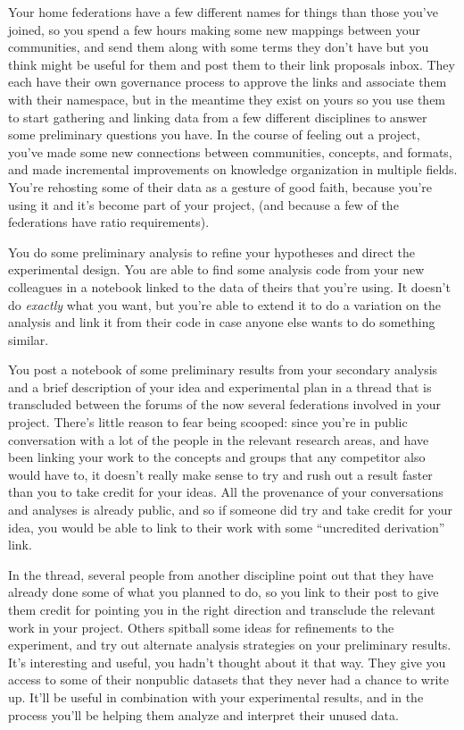 \documentclass[10pt]{article}
\begin{document}
\begin{multicols}{2}
Your home federations have a few different names for things than those
you've joined, so you spend a few hours making some new mappings between
your communities, and send them along with some terms they don't have
but you think might be useful for them and post them to their link
proposals inbox. They each have their own governance process to approve
the links and associate them with their namespace, but in the meantime
they exist on yours so you use them to start gathering and linking data
from a few different disciplines to answer some preliminary questions
you have. In the course of feeling out a project, you've made some new
connections between communities, concepts, and formats, and made
incremental improvements on knowledge organization in multiple fields.
You're rehosting some of their data as a gesture of good faith, because
you're using it and it's become part of your project, (and because a few
of the federations have ratio requirements).

You do some preliminary analysis to refine your hypotheses and direct
the experimental design. You are able to find some analysis code from
your new colleagues in a notebook linked to the data of theirs that
you're using. It doesn't do \emph{exactly} what you want, but you're
able to extend it to do a variation on the analysis and link it from
their code in case anyone else wants to do something similar.

You post a notebook of some preliminary results from your secondary
analysis and a brief description of your idea and experimental plan in a
thread that is transcluded between the forums of the now several
federations involved in your project. There's little reason to fear
being scooped: since you're in public conversation with a lot of the
people in the relevant research areas, and have been linking your work
to the concepts and groups that any competitor also would have to, it
doesn't really make sense to try and rush out a result faster than you
to take credit for your ideas. All the provenance of your conversations
and analyses is already public, and so if someone did try and take
credit for your idea, you would be able to link to their work with some
``uncredited derivation'' link.

In the thread, several people from another discipline point out that
they have already done some of what you planned to do, so you link to
their post to give them credit for pointing you in the right direction
and transclude the relevant work in your project. Others spitball some
ideas for refinements to the experiment, and try out alternate analysis
strategies on your preliminary results. It's interesting and useful, you
hadn't thought about it that way. They give you access to some of their
nonpublic datasets that they never had a chance to write up. It'll be
useful in combination with your experimental results, and in the process
you'll be helping them analyze and interpret their unused data.


\end{multicols}
\end{document}
